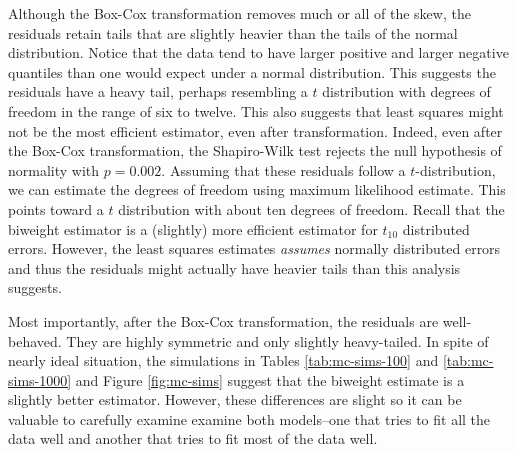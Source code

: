 \documentclass[12pt]{article}
\begin{document}
Although the Box-Cox transformation removes much or all of the skew, the residuals retain tails that are slightly heavier than the tails of the normal distribution. Notice that the data tend to have larger positive and larger negative quantiles than one would expect under a normal distribution. This suggests the residuals have a heavy tail, perhaps resembling a $t$ distribution with degrees of freedom in the range of six to twelve. This also suggests that least squares might not be the most efficient estimator, even after transformation. Indeed, even after the Box-Cox transformation, the Shapiro-Wilk test rejects the null hypothesis of normality with $p = 0.002$. Assuming that these residuals follow a $t$-distribution, we can estimate the degrees of freedom using maximum likelihood estimate. This points toward a $t$ distribution with about ten degrees of freedom. Recall that the biweight estimator is a (slightly) more efficient estimator for $t_{10}$ distributed errors. However, the least squares estimates \textit{assumes} normally distributed errors and thus the residuals might actually have heavier tails than this analysis suggests.

Most importantly, after the Box-Cox transformation, the residuals are well-behaved. They are highly symmetric and only slightly heavy-tailed. In spite of nearly ideal situation, the simulations in Tables \ref{tab:mc-sims-100} and \ref{tab:mc-sims-1000} and Figure \ref{fig:mc-sims} suggest that the biweight estimate is a slightly better estimator. However, these differences are slight so it can be valuable to carefully examine examine both models--one that tries to fit all the data well and another that tries to fit most of the data well.



%
\end{document}
